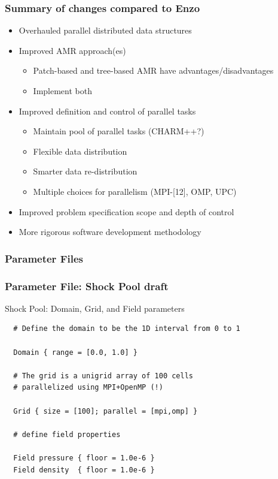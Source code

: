 \documentclass{beamer}
\newcommand{\enzo}{\textsf{Enzo}}
\begin{document}
\begin{frame}
\frametitle{Summary of changes compared to \enzo}
\begin{itemize}
\item Overhauled parallel distributed data structures
\item Improved AMR approach(es)
\begin{itemize}
\item  Patch-based and tree-based AMR have advantages/disadvantages
\item  Implement both
\end{itemize}
\item Improved definition and control of parallel tasks
\begin{itemize}
\item Maintain pool of parallel tasks (CHARM++?)
\item Flexible data distribution
\item Smarter  data re-distribution
\item Multiple choices for parallelism (MPI-[12], OMP, UPC)
\end{itemize}
\item Improved problem specification scope and depth of control
\item More rigorous software development methodology
\end{itemize}
\end{frame}
    \begin{frame}[fragile] \frametitle{Parameter Files}
\end{frame}

    \begin{frame}[fragile] \frametitle{Parameter File: Shock Pool draft}
 \footnotesize
\begin{block}{Shock Pool: Domain, Grid, and Field parameters}
      \begin{verbatim}
  # Define the domain to be the 1D interval from 0 to 1

  Domain { range = [0.0, 1.0] }

  # The grid is a unigrid array of 100 cells 
  # parallelized using MPI+OpenMP (!)
 
  Grid { size = [100]; parallel = [mpi,omp] }

  # define field properties

  Field pressure { floor = 1.0e-6 }
  Field density  { floor = 1.0e-6 }
      \end{verbatim}
\end{block}
\end{frame}
\end{document}

